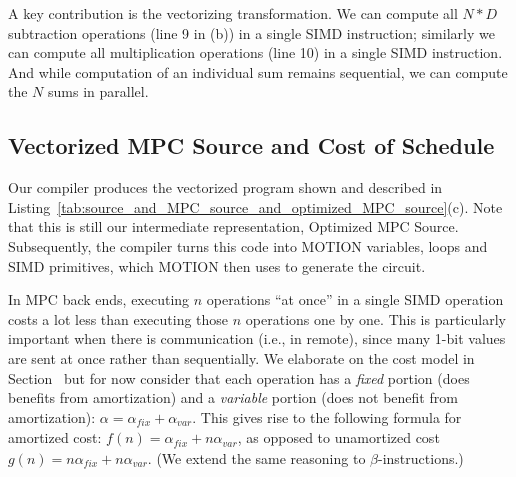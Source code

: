 A key contribution is the vectorizing transformation. We can compute all $N*D$
subtraction operations (line 9 in (b)) in a single SIMD instruction; similarly we can compute
all multiplication operations (line 10) in a single SIMD instruction. And while computation
of an individual sum remains sequential, we can compute the $N$ sums in parallel.

\subsection{Vectorized MPC Source and Cost of Schedule}

Our compiler produces the vectorized program shown and described in 
Listing~\ref{tab:source_and_MPC_source_and_optimized_MPC_source}(c).
Note that this is still our intermediate representation, Optimized MPC Source. Subsequently,
the compiler turns this code into MOTION variables, loops and SIMD primitives, which MOTION then
uses to generate the circuit.
\begin{comment}
The compiler determines that SUB and MUL in ``naive'' MPC Source (lines 9 and 10 in (b))
can be fully vectorized into the SIMD SUB and MUL in optimized MPC Source (lines 9 and 10 in (c)).
Notation {\sf p[I,J]} denotes a 2-dimensional array with fully vectorized dimensions.
The computation of sum (line 11 in (b))
is sequential across the $j$-dimension, but it is parallel across the $i$-dimension.
The loop in lines 12-16 in (c) illustrates; here {\sf p[I,j]} refers to the $j$-th column in {\sf p}.
Unfortunately, CMP and MUX remain sequential.
\end{comment}

In MPC back ends, executing $n$ operations ``at once'' in a single SIMD operation costs a lot less than executing those $n$ operations one by one.
This is particularly important when there is communication (i.e., in remote), since many 1-bit values are sent at once rather than sequentially.
We elaborate on the cost model in Section~ but for now consider that
each operation has a \emph{fixed} portion (does benefits from amortization) and
a \emph{variable} portion (does not benefit from amortization): $\alpha = \alpha_\mathit{fix} + \alpha_\mathit{var}$.
This gives rise to the following formula for amortized cost: $f(n) = \alpha_\mathit{fix} + n\alpha_\mathit{var}$,
as opposed to unamortized cost $g(n) = n\alpha_\mathit{fix} + n\alpha_\mathit{var}$. (We extend the same reasoning to
$\beta$-instructions.)

